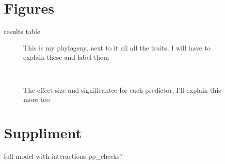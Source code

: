 \documentclass{article}\usepackage[]{graphicx}\usepackage[]{color}
\begin{document}
\section{Figures}
results table
\begin{figure}[H]
  \caption{This is my phylogeny, next to it all all the traits, I will have to explain these and label them}
  \label{Tree}
\end{figure}\\
\begin{figure}[H]
  \caption{The effect size and significantce for each predictor, I'll explain this more too}
  \label{Effect sizes}
\end{figure}

\section{Suppliment}
full model with interactions
pp_checks?
\end{document}
